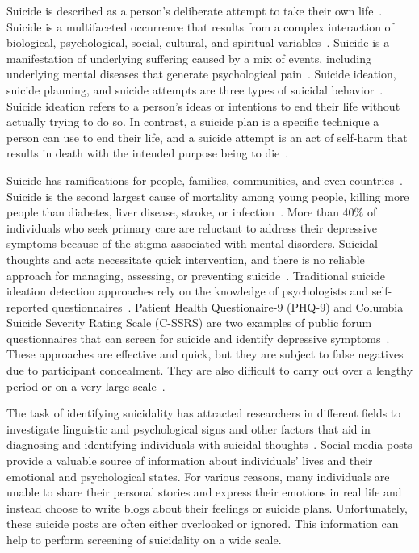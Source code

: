 \documentclass[11pt]{article}
\begin{document}
Suicide is described as a person's deliberate attempt to take their own life~\cite{2nock2008suicide}. Suicide is a multifaceted occurrence that results from a complex interaction of biological, psychological, social, cultural, and spiritual variables~\cite{3beck1979assessment}. Suicide is a manifestation of underlying suffering caused by a mix of events, including underlying mental diseases that generate psychological pain~\cite{4liu2020suicidal}. Suicide ideation, suicide planning, and suicide attempts are three types of suicidal behavior~\cite{2nock2008suicide,3beck1979assessment,4liu2020suicidal}. Suicide ideation refers to a person's ideas or intentions to end their life without actually trying to do so. In contrast, a suicide plan is a specific technique a person can use to end their life, and a suicide attempt is an act of self-harm that results in death with the intended purpose being to die~\cite{2nock2008suicide,3beck1979assessment,4liu2020suicidal}.

Suicide has ramifications for people, families, communities, and even countries~\cite{4liu2020suicidal}. Suicide is the second largest cause of mortality among young people, killing more people than diabetes, liver disease, stroke, or infection~\cite{5weber2017psychiatric}. More than 40\% of individuals who seek primary care are reluctant to address their depressive symptoms because of the stigma associated with mental disorders. Suicidal thoughts and acts necessitate quick intervention, and there is no reliable approach for managing, assessing, or preventing suicide~\cite{5weber2017psychiatric}. 
Traditional suicide ideation detection approaches rely on the knowledge of psychologists and self-reported questionnaires~\cite{4liu2020suicidal}. Patient Health Questionaire-9 (PHQ-9) and Columbia Suicide Severity Rating Scale (C-SSRS) are two examples of public forum questionnaires that can screen for suicide and identify depressive symptoms~\cite{5weber2017psychiatric}. These approaches are effective and quick, but they are subject to false negatives due to participant concealment. They are also difficult to carry out over a lengthy period or on a very large scale~\cite{5weber2017psychiatric}.

The task of identifying suicidality has attracted researchers in different fields to investigate linguistic and psychological signs and other factors that aid in diagnosing and identifying individuals with suicidal thoughts~\cite{4liu2020suicidal}.
Social media posts provide a valuable source of information about individuals' lives and their emotional and psychological states.
For various reasons, many individuals are unable to share their personal stories and express their emotions in real life and instead choose to write blogs about their feelings or suicide plans. Unfortunately, these suicide posts are often either overlooked or ignored. This information can help to perform screening of suicidality on a wide scale.
\end{document}
